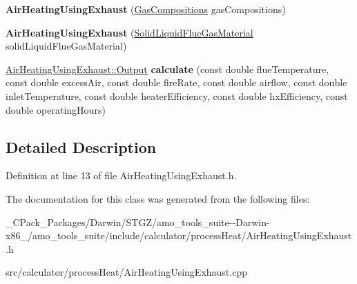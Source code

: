 \begin{DoxyCompactItemize}
\mbox{\label{class_air_heating_using_exhaust_ad045db7365fe15661f874334ef5a0ac5}} 
{\bfseries Air\+Heating\+Using\+Exhaust} (\hyperlink{class_gas_compositions}{Gas\+Compositions} gas\+Compositions)
\item 
\mbox{\label{class_air_heating_using_exhaust_a328f1777f5cbbc7616396e86e91c97c3}} 
{\bfseries Air\+Heating\+Using\+Exhaust} (\hyperlink{class_solid_liquid_flue_gas_material}{Solid\+Liquid\+Flue\+Gas\+Material} solid\+Liquid\+Flue\+Gas\+Material)
\item 
\mbox{\label{class_air_heating_using_exhaust_a0f0647110e8e93268e0c1cbc65fdd4af}} 
\hyperlink{struct_air_heating_using_exhaust_1_1_output}{Air\+Heating\+Using\+Exhaust\+::\+Output} {\bfseries calculate} (const double flue\+Temperature, const double excess\+Air, const double fire\+Rate, const double airflow, const double inlet\+Temperature, const double heater\+Efficiency, const double hx\+Efficiency, const double operating\+Hours)
\end{DoxyCompactItemize}


\subsection{Detailed Description}


Definition at line 13 of file Air\+Heating\+Using\+Exhaust.\+h.



The documentation for this class was generated from the following files\+:\begin{DoxyCompactItemize}
\item 
\+\_\+\+C\+Pack\+\_\+\+Packages/\+Darwin/\+S\+T\+G\+Z/amo\+\_\+tools\+\_\+suite-\/-\/\+Darwin-\/x86\+\_/amo\+\_\+tools\+\_\+suite/include/calculator/process\+Heat/Air\+Heating\+Using\+Exhaust.\+h\item 
src/calculator/process\+Heat/Air\+Heating\+Using\+Exhaust.\+cpp\end{DoxyCompactItemize}
